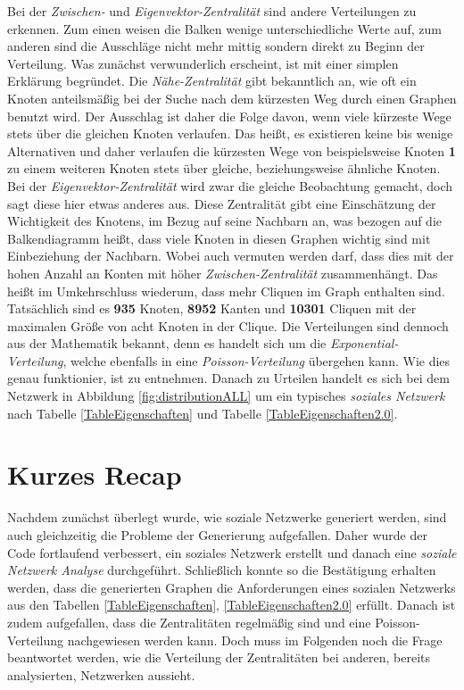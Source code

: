 Bei der \textit{Zwischen-} und \textit{Eigenvektor-Zentralität} sind andere Verteilungen zu erkennen. Zum einen weisen die Balken wenige unterschiedliche Werte auf, zum anderen sind die Ausschläge nicht mehr mittig sondern direkt zu Beginn der Verteilung. Was zunächst verwunderlich erscheint, ist mit einer simplen Erklärung begründet. Die \textit{Nähe-Zentralität} gibt bekanntlich an, wie oft ein Knoten anteilsmäßig bei der Suche nach dem kürzesten Weg durch einen Graphen benutzt wird. Der Ausschlag ist daher die Folge davon, wenn viele kürzeste Wege stets über die gleichen Knoten verlaufen. Das heißt, es existieren keine bis wenige Alternativen und daher verlaufen die kürzesten Wege von beispielsweise Knoten \textbf{1} zu einem weiteren Knoten stets über gleiche, beziehungsweise ähnliche Knoten. Bei der \textit{Eigenvektor-Zentralität} wird zwar die gleiche Beobachtung gemacht, doch sagt diese hier etwas anderes aus. Diese Zentralität gibt eine Einschätzung der Wichtigkeit des Knotens, im Bezug auf seine Nachbarn an, was bezogen auf die Balkendiagramm heißt, dass viele Knoten in diesen Graphen wichtig sind mit Einbeziehung der Nachbarn. Wobei auch vermuten werden darf, dass dies mit der hohen Anzahl an Konten mit höher \textit{Zwischen-Zentralität} zusammenhängt.\newpage
Das heißt im Umkehrschluss wiederum, dass mehr Cliquen im Graph enthalten sind. Tatsächlich sind es \textbf{935} Knoten, \textbf{8952} Kanten und \textbf{10301} Cliquen mit der maximalen Größe von acht Knoten in der Clique.
Die Verteilungen sind dennoch aus der Mathematik bekannt, denn es handelt sich um die \textit{Exponential-Verteilung}, welche ebenfalls in eine \textit{Poisson-Verteilung} übergehen kann. Wie dies genau funktionier, ist \cite{PoissonMathepedia} zu entnehmen.
Danach zu Urteilen handelt es sich bei dem Netzwerk in Abbildung \ref{fig:distributionALL} um ein typisches \textit{soziales Netzwerk} nach Tabelle \ref{TableEigenschaften} und Tabelle \ref{TableEigenschaften2.0}.

\section{Kurzes Recap}
Nachdem zunächst überlegt wurde, wie soziale Netzwerke generiert werden, sind auch gleichzeitig die Probleme der Generierung aufgefallen. Daher wurde der Code fortlaufend verbessert, ein soziales Netzwerk erstellt und danach eine \textit{soziale Netzwerk Analyse} durchgeführt. Schließlich konnte so die Bestätigung erhalten werden, dass die generierten Graphen die Anforderungen eines sozialen Netzwerks aus den Tabellen \ref{TableEigenschaften}, \ref{TableEigenschaften2.0} erfüllt. Danach ist zudem aufgefallen, dass die Zentralitäten regelmäßig sind und eine Poisson-Verteilung nachgewiesen werden kann. Doch muss im Folgenden noch die Frage beantwortet werden, wie die Verteilung der Zentralitäten bei anderen, bereits analysierten, Netzwerken aussieht.

